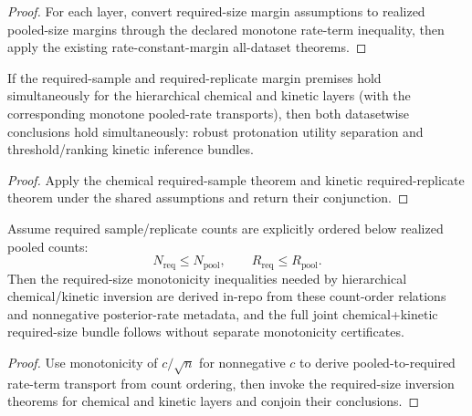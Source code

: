 \begin{proof}
For each layer, convert required-size margin assumptions to realized pooled-size margins through the declared monotone rate-term inequality, then apply the existing rate-constant-margin all-dataset theorems.
\end{proof}

\begin{theorem}\label{thm:hierarchical-required-size-joint-bundle}
If the required-sample and required-replicate margin premises hold simultaneously for the hierarchical chemical and kinetic layers (with the corresponding monotone pooled-rate transports), then both datasetwise conclusions hold simultaneously: robust protonation utility separation and threshold/ranking kinetic inference bundles.
\end{theorem}

\begin{proof}
Apply the chemical required-sample theorem and kinetic required-replicate theorem under the shared assumptions and return their conjunction.
\end{proof}

\begin{theorem}\label{thm:finite-sample-complexity-inversion-count-order}
Assume required sample/replicate counts are explicitly ordered below realized pooled counts:
\[
N_{\mathrm{req}} \le N_{\mathrm{pool}},\qquad
R_{\mathrm{req}} \le R_{\mathrm{pool}}.
\]
Then the required-size monotonicity inequalities needed by hierarchical chemical/kinetic inversion are derived in-repo from these count-order relations and nonnegative posterior-rate metadata, and the full joint chemical+kinetic required-size bundle follows without separate monotonicity certificates.
\end{theorem}

\begin{proof}
Use monotonicity of $c/\sqrt{n}$ for nonnegative $c$ to derive pooled-to-required rate-term transport from count ordering, then invoke the required-size inversion theorems for chemical and kinetic layers and conjoin their conclusions.
\end{proof}

